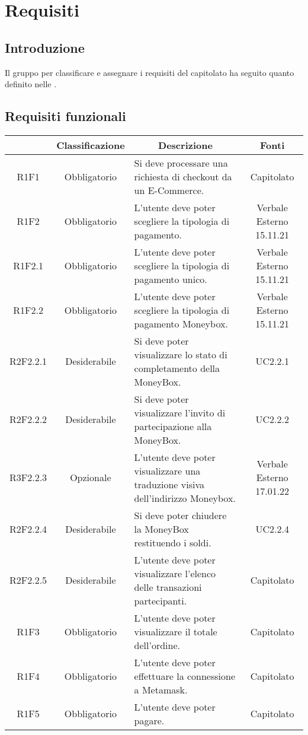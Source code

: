 \section{Requisiti} \label{section:requisiti}

\subsection{Introduzione}
Il gruppo \groupName{} per classificare e assegnare i requisiti del capitolato ha seguito quanto definito nelle \docNameVersionNdP{}.

\subsection{Requisiti funzionali} \label{subsection:requisiti_funzionali}
\begin{table}[H]
    \centering
    \renewcommand{\arraystretch}{1.8}
    \begin{tabular}{c | c | p{6cm} | c}
        \rowcolor[HTML]{125E28}
        \multicolumn{1}{c}{\color[HTML]{FFFFFF} \textbf{Codice}} & 
		\multicolumn{1}{c}{\color[HTML]{FFFFFF} \textbf{Classificazione}} & 
		\multicolumn{1}{c}{\color[HTML]{FFFFFF} \textbf{Descrizione}} & 
		\multicolumn{1}{c}{\color[HTML]{FFFFFF} \textbf{Fonti}} \\
        \hline
        R1F1 & Obbligatorio & Si deve processare una richiesta di checkout da un E-Commerce. & Capitolato \\
        R1F2 & Obbligatorio & L'utente deve poter scegliere la tipologia di pagamento. & Verbale Esterno 15.11.21 \\
        R1F2.1 & Obbligatorio & L'utente deve poter scegliere la tipologia di pagamento unico. & Verbale Esterno 15.11.21\\
        R1F2.2 & Obbligatorio & L'utente deve poter scegliere la tipologia di pagamento Moneybox. & Verbale Esterno 15.11.21\\
        R2F2.2.1 & Desiderabile & Si deve poter visualizzare lo stato di completamento della MoneyBox. & UC2.2.1 \\
        R2F2.2.2 & Desiderabile & Si deve poter visualizzare l'invito di partecipazione alla MoneyBox. & UC2.2.2 \\
        R3F2.2.3 & Opzionale & L'utente deve poter visualizzare una traduzione visiva dell'indirizzo Moneybox. & Verbale Esterno 17.01.22 \\
        R2F2.2.4 & Desiderabile & Si deve poter chiudere la MoneyBox restituendo i soldi. & UC2.2.4 \\
        R2F2.2.5 & Desiderabile & L'utente deve poter visualizzare l'elenco delle transazioni partecipanti. & Capitolato \\
        R1F3 & Obbligatorio & L'utente deve poter visualizzare il totale dell'ordine. & Capitolato \\
        R1F4 & Obbligatorio & L'utente deve poter effettuare la connessione a Metamask. & Capitolato \\
        R1F5 & Obbligatorio & L'utente deve poter pagare. & Capitolato \\
    \end{tabular}
\end{table}
